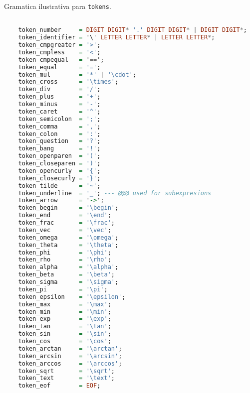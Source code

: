 \begin{codigo}[htb]
    \caption{\small Gramatica ilustrativa para \texttt{tokens}. }
        \label{grammar-tokens}
  \begin{lstlisting}[language = haskell]

    token_number     = DIGIT DIGIT* '.' DIGIT DIGIT* | DIGIT DIGIT*;
    token_identifier = '\' LETTER LETTER* | LETTER LETTER*;
    token_cmpgreater = '>';
    token_cmpless    = '<';
    token_cmpequal   = '==';
    token_equal      = '=';
    token_mul        = '*' | '\cdot';
    token_cross      = '\times';
    token_div        = '/';
    token_plus       = '+';
    token_minus      = '-';
    token_caret      = '^';
    token_semicolon  = ';';
    token_comma      = ',';
    token_colon      = ':';
    token_question   = '?';
    token_bang       = '!';
    token_openparen  = '(';
    token_closeparen = ')';
    token_opencurly  = '{';
    token_closecurly = '}';
    token_tilde      = '~';
    token_underline  = '_'; --- @@@ used for subexpresions
    token_arrow      = '->';
    token_begin      = '\begin';
    token_end        = '\end';
    token_frac       = '\frac';
    token_vec        = '\vec';
    token_omega      = '\omega';
    token_theta      = '\theta';
    token_phi        = '\phi';
    token_rho        = '\rho';
    token_alpha      = '\alpha';
    token_beta       = '\beta';
    token_sigma      = '\sigma';
    token_pi         = '\pi';
    token_epsilon    = '\epsilon';
    token_max        = '\max';
    token_min        = '\min';
    token_exp        = '\exp';
    token_tan        = '\tan';
    token_sin        = '\sin';
    token_cos        = '\cos';
    token_arctan     = '\arctan';
    token_arcsin     = '\arcsin';
    token_arccos     = '\arccos';
    token_sqrt       = '\sqrt';
    token_text       = '\text';
    token_eof        = EOF;
    
  \end{lstlisting}
\end{codigo}
